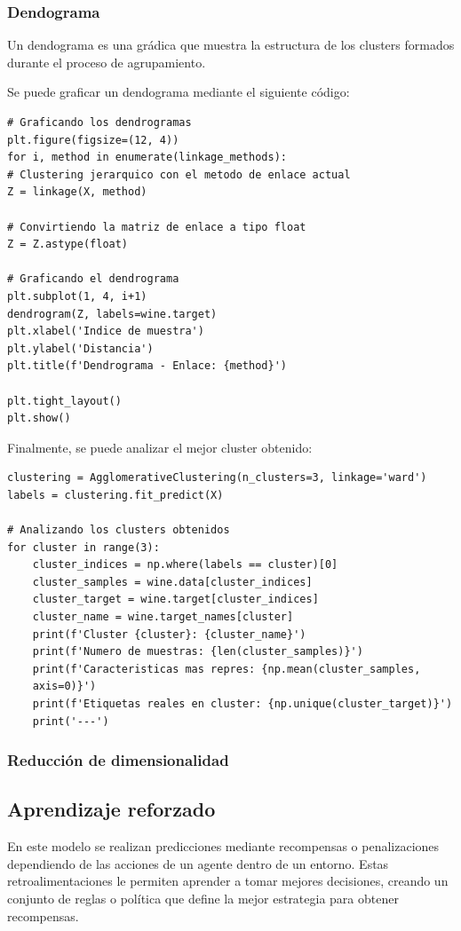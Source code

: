 \documentclass[a4paper, 12pt]{book}
\begin{document}
\subsubsection{Dendograma}
Un dendograma es una grádica que muestra la estructura de los clusters formados durante el proceso de agrupamiento.

Se puede graficar un dendograma mediante el siguiente código:
\begin{verbatim}
# Graficando los dendrogramas
plt.figure(figsize=(12, 4))
for i, method in enumerate(linkage_methods):
# Clustering jerarquico con el metodo de enlace actual
Z = linkage(X, method)

# Convirtiendo la matriz de enlace a tipo float
Z = Z.astype(float)

# Graficando el dendrograma
plt.subplot(1, 4, i+1)
dendrogram(Z, labels=wine.target)
plt.xlabel('Indice de muestra')
plt.ylabel('Distancia')
plt.title(f'Dendrograma - Enlace: {method}')

plt.tight_layout()
plt.show()
\end{verbatim}

Finalmente, se puede analizar el mejor cluster obtenido:
\begin{verbatim}
clustering = AgglomerativeClustering(n_clusters=3, linkage='ward')
labels = clustering.fit_predict(X)

# Analizando los clusters obtenidos
for cluster in range(3):
	cluster_indices = np.where(labels == cluster)[0]
	cluster_samples = wine.data[cluster_indices]
	cluster_target = wine.target[cluster_indices]
	cluster_name = wine.target_names[cluster]
	print(f'Cluster {cluster}: {cluster_name}')
	print(f'Numero de muestras: {len(cluster_samples)}')
	print(f'Caracteristicas mas repres: {np.mean(cluster_samples,
	axis=0)}')
	print(f'Etiquetas reales en cluster: {np.unique(cluster_target)}')
	print('---')
\end{verbatim}
\subsubsection{Reducción de dimensionalidad}



\subsection{Aprendizaje reforzado}
En este modelo se realizan predicciones mediante recompensas o penalizaciones dependiendo de las acciones de un agente dentro de un entorno. Estas retroalimentaciones le permiten aprender a tomar mejores decisiones, creando un conjunto de reglas o política que define la mejor estrategia para obtener recompensas.
\end{document}
